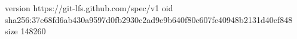 version https://git-lfs.github.com/spec/v1
oid sha256:37e68fd6ab430a9597d0fb2930c2ad9e9b640f80c607fe40948b2131d40ef848
size 148260
